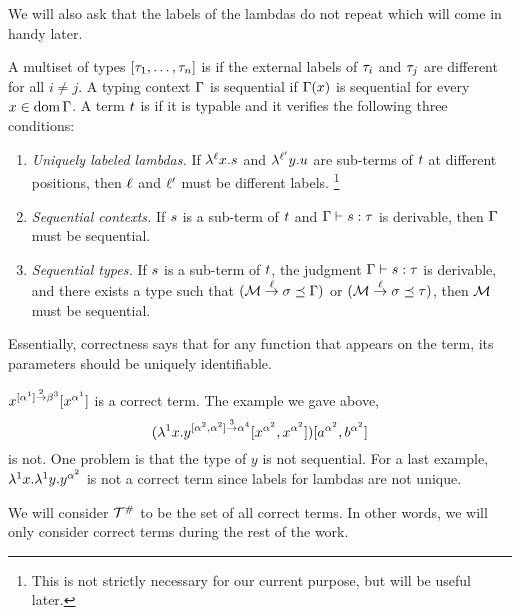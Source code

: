 We will also ask that the labels of the lambdas do not repeat which
will come in handy later.

\begin{definition}
A multiset of types $[\tau_1,\hdots,\tau_n]$ is 
if the external labels of $\tau_i$ and $\tau_j$ are different for all $i \neq j$.
A typing context $\Gamma$ is sequential if $\Gamma(x)$ is sequential for every $x \in \operatorname{dom}\Gamma$.
A term $t$ is  if it is typable and it verifies the following three conditions:
\begin{enumerate}
\item {\em Uniquely labeled lambdas.}
  If $\lambda^{\ell} x. s$ and $\lambda^{\ell'} y. u$
  are sub-terms of $t$ at different positions, then $\ell$ and $\ell'$
  must be different labels.
  \footnote{This is not strictly necessary for our current purpose, but will be useful later.}
\item {\em Sequential contexts.}
  If $s$ is a sub-term of $t$ and $\Gamma \vdash s : \tau$
  is derivable, then $\Gamma$ must be sequential.
\item {\em Sequential types.}
  If $s$ is a sub-term of $t$,
  the judgment $\Gamma \vdash s : \tau$ is derivable,
  and there exists a type such that
  $(\mathcal{M} \overset{\ell}{\to} \sigma \preceq \Gamma)$ or $(\mathcal{M} \overset{\ell}{\to} \sigma \preceq \tau)$,
  then $\mathcal{M}$ must be sequential.
\end{enumerate}
\end{definition}

Essentially, correctness says that for
any function that appears on the term, its parameters should be uniquely identifiable.

\begin{example}
$x^{[\alpha^1] \overset{2}{\to} \beta^3}[x^{\alpha^1}]$ is a correct term.
The example we gave above,
\[(\lambda^{1} x. y^{[\alpha^2, \alpha^2] \overset{3}{\to} \alpha^4} [x^{\alpha^2}, x^{\alpha^2}])
[a^{\alpha^2}, b^{\alpha^2}]\]
is not.
One problem is that the type of $y$ is not sequential.
For a last example,
$\lambda^{1} x. \lambda^{1} y. y^{\alpha^2}$
is not a correct term since labels for lambdas are not unique.
\end{example}

\begin{remark}
We will consider $\mathcal{T}^{\mathtt{\#}}$ to be the set of all correct terms.
In other words, we will only consider correct terms during the rest of the work.
\end{remark}


